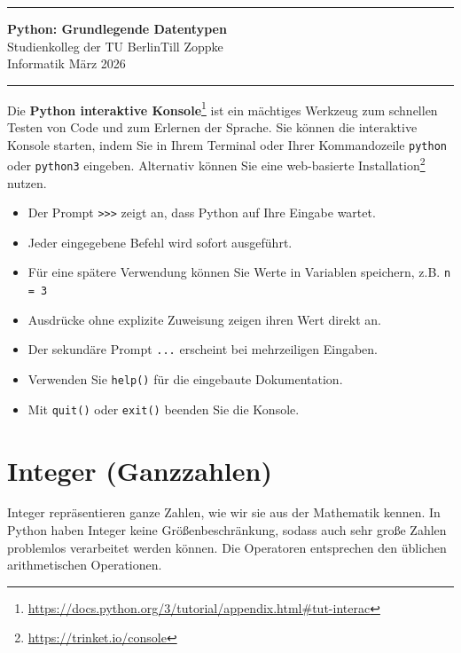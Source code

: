 \documentclass[ngerman,11pt]{article}
\begin{document}
\hrule
\begin{center}
{\large\bf Python: Grundlegende Datentypen}\\[-0mm]
Studienkolleg der TU Berlin\hfill Till Zoppke\\
Informatik \hfill März 2026\\[2mm]
\end{center}
\hrule
\par\bigskip
\noindent
Die \textbf{Python interaktive Konsole}\footnote{\url{https://docs.python.org/3/tutorial/appendix.html\#tut-interac}} ist ein mächtiges Werkzeug zum schnellen Testen von Code und zum Erlernen der Sprache. Sie können die interaktive Konsole starten, indem Sie in Ihrem Terminal oder Ihrer Kommandozeile \texttt{python} oder \texttt{python3} eingeben. Alternativ können Sie eine web-basierte Installation\footnote{\url{https://trinket.io/console}} nutzen.

\begin{itemize}[itemsep=1pt]
    \item Der Prompt \texttt{>>>} zeigt an, dass Python auf Ihre Eingabe wartet.
    \item Jeder eingegebene Befehl wird sofort ausgeführt.
    \item Für eine spätere Verwendung können Sie Werte in Variablen speichern, z.B. \texttt{n = 3}
    \item Ausdrücke ohne explizite Zuweisung zeigen ihren Wert direkt an.
    \item Der sekundäre Prompt \texttt{...} erscheint bei mehrzeiligen Eingaben.
    \item Verwenden Sie \texttt{help()} für die eingebaute Dokumentation.
    \item Mit \texttt{quit()} oder \texttt{exit()} beenden Sie die Konsole.
\end{itemize}

\section{Integer (Ganzzahlen)}

Integer repräsentieren ganze Zahlen, wie wir sie aus der Mathematik kennen. In Python haben Integer keine Größenbeschränkung, sodass auch sehr große Zahlen problemlos verarbeitet werden können. Die Operatoren entsprechen den üblichen arithmetischen Operationen.
\end{document}
